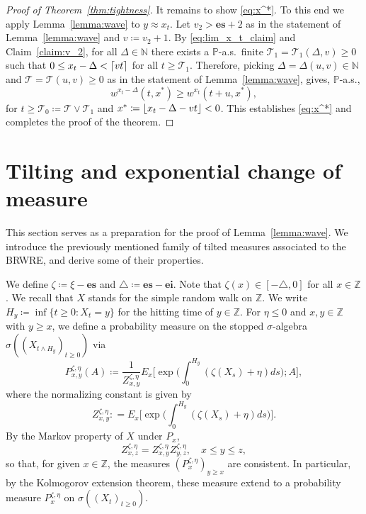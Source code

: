 \documentclass[12pt,reqno,oneside]{amsart}
\numberwithin{equation}{section}
\theoremstyle{definition}
\theoremstyle{remark}
\newcommand{\N}{\mathbb{N}}
\newcommand{\Z}{\mathbb{Z}}
\newcommand{\PP}{\mathbb{P}}
\newcommand{\es}{\mathbf{es}}
\newcommand{\ei}{\mathbf{ei}}
\DeclarePairedDelimiter{\ceil}{\lceil}{\rceil}
\DeclarePairedDelimiter{\floor}{\lfloor}{\rfloor}
\begin{document}
\begin{proof}[Proof of Theorem~\ref{thm:tightness}]
  It remains to show \eqref{eq:x^*}. To this end we apply
  Lemma~\ref{lemma:wave} to $y \approx x_t$. Let $v_2>\es+2$ as in the
  statement of Lemma~\ref{lemma:wave} and $v\coloneq v_2+1$. By
  \eqref{eq:lim_x_t_claim} and Claim~\ref{claim:v_2}, for all $\Delta \in \N$ there exists a $\PP$-a.s.~finite $\mathcal{T}_1=\mathcal{T}_1(\Delta,v)\geq 0$ such that
  $0 \leq x_t-\Delta < \ceil{vt}$  for all $t \geq \mathcal{T}_1$. Therefore, picking $\Delta=\Delta(u,v) \in \N$ and $\mathcal{T}= \mathcal{T}(u,v) \geq 0$ as in the statement
  of Lemma~\ref{lemma:wave}, gives, $\PP$-a.s.,
  \begin{equation*}
    w^{x_t-\Delta}(t,x^*) \geq w^{x_t}(t+u,x^*),
  \end{equation*}
  for $t \geq \mathcal{T}_0\coloneq\mathcal{T}\vee \mathcal{T}_1$ and $x^*\coloneq\floor{x_t-\Delta-vt}<0$.
  This establishes \eqref{eq:x^*} and completes the proof of the theorem.
\end{proof}


\section{Tilting and exponential change of measure}
\label{sec:tilting}

This section serves as a preparation for the proof of Lemma~\ref{lemma:wave}.
We introduce the previously mentioned family of tilted measures associated to
the BRWRE, and derive some of their properties.

We define $\zeta\coloneq\xi-\es$ and $\triangle\coloneq\es-\ei$. Note that
$\zeta(x)\in [-\triangle,0]$ for all $x \in \Z$. We recall that $X$ stands
for the simple random walk on $\mathbb Z$. We write
$H_y\coloneq\inf \{ t \geq 0: X_t = y\}$ for the hitting time of
$y\in \mathbb Z$. For $\eta \le 0$ and $x,y \in \Z$ with $y \geq x$, we
define a probability measure on the stopped $\sigma$-algebra
$\sigma( (X_{t \wedge H_y})_{t \geq 0})$ via
\begin{equation*}
  P_{x,y}^{\zeta, \eta}(A)
  \coloneq \frac{1}{Z_{x,y}^{\zeta,\eta}}
  E_x\bigg[ \exp \Big( \int_0^{H_y} (\zeta(X_s)+\eta)  ds \Big) ; A \bigg],
\end{equation*}
where the normalizing constant is given by
\begin{equation}
  \label{eqn:Z}
  Z_{x,y}^{\zeta,\eta}:
  = E_x\bigg[ \exp \Big( \int_0^{H_y} (\zeta(X_s)+\eta)  ds \Big) \bigg].
\end{equation}
By the Markov property of $X$ under $P_x$,
\begin{equation}\label{eq:Zxy}
  Z_{x,z}^{\zeta,\eta}=Z_{x,y}^{\zeta,\eta}Z_{y,z}^{\zeta,\eta},
  \quad x \leq y \leq z,
\end{equation}
so that, for given $x \in \Z$, the measures $(P_x^{\zeta,\eta})_{y \geq x }$ are consistent. In particular, by the Kolmogorov extension theorem,
these measure extend to a probability measure $P_x^{\zeta,\eta}$ on $\sigma((X_t)_{t \geq 0})$.
\end{document}
